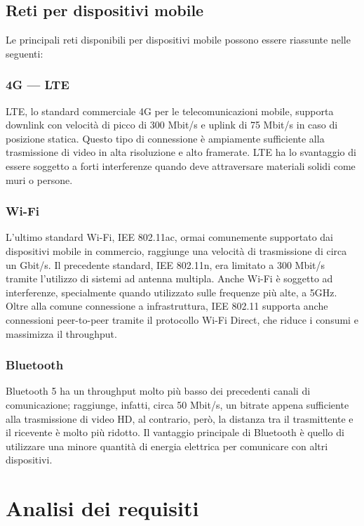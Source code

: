 			\subsection{Reti per dispositivi mobile}
			Le principali reti disponibili per dispositivi mobile possono essere riassunte nelle seguenti:
			\subsubsection{4G --- LTE}
			LTE, lo standard commerciale 4G per le telecomunicazioni mobile, supporta downlink con velocità di picco di 300 Mbit/s e uplink di 75 Mbit/s in caso di posizione statica. Questo tipo di connessione è ampiamente sufficiente alla trasmissione di video in alta risoluzione e alto framerate. LTE ha lo svantaggio di essere soggetto a forti interferenze quando deve attraversare materiali solidi come muri o persone.
			\subsubsection{Wi-Fi}
			L'ultimo standard Wi-Fi, IEE 802.11ac, ormai comunemente supportato dai dispositivi mobile in commercio, raggiunge una velocità di trasmissione di circa un Gbit/s. Il precedente standard, IEE 802.11n, era limitato a 300 Mbit/s tramite l'utilizzo di sistemi ad antenna multipla. Anche Wi-Fi è soggetto ad interferenze, specialmente quando utilizzato sulle frequenze più alte, a 5GHz. Oltre alla comune connessione a infrastruttura, IEE 802.11 supporta anche connessioni peer-to-peer tramite il protocollo Wi-Fi Direct, che riduce i consumi e massimizza il throughput.
			\subsubsection{Bluetooth}
			Bluetooth 5 ha un throughput molto più basso dei precedenti canali di comunicazione; raggiunge, infatti, circa 50 Mbit/s, un bitrate appena sufficiente alla trasmissione di video HD, al contrario, però, la distanza tra il trasmittente e il ricevente è molto più ridotto. Il vantaggio principale di Bluetooth è quello di utilizzare una minore quantità di energia elettrica per comunicare con altri dispositivi.

\section{Analisi dei requisiti}
